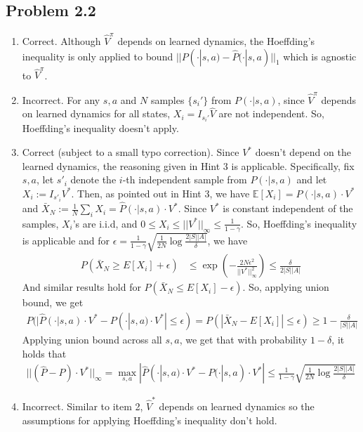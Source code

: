 \documentclass{article}
\begin{document}
\subsection*{Problem 2.2}
\begin{enumerate}
    \item Correct. Although $\widehat{V}^\pi$ depends on learned dynamics, the Hoeffding's inequality is only applied to bound $||P(\cdot | s, a) - \widehat{P}(\cdot | s, a)||_1$ which is agnostic to $\widehat{V}^\pi$.
    \item Incorrect. For any $s, a$ and $N$ samples $\{s_i'\}$ from $P(\cdot |s, a)$, since $\widehat{V}^\pi$ depends on learned dynamics for all states, $X_i = I_{s_i'}\widehat{V}$ are not independent. So, Hoeffding's inequality doesn't apply.
    \item Correct (subject to a small typo correction). Since $V^*$ doesn't depend on the learned dynamics, the reasoning given in Hint 3 is applicable. Specifically, fix $s, a$, let $s'_i$ denote the $i$-th independent sample from $P(\cdot |s, a)$ and let $X_i := I_{s'_i}V^*$. Then, as pointed out in Hint 3, we have $\mathbb{E}[X_i] = P(\cdot |s, a) \cdot V^*$ and $\bar{X}_N := \frac{1}{N}\sum_i X_i = \widehat{P}(\cdot |s, a) \cdot V^*$. Since $V^*$ is constant independent of the samples, $X_i$'s are i.i.d, and $0 \leq X_i \leq ||V^*||_\infty \leq \frac{1}{1 - \gamma}$.
    So, Hoeffding's inequality is applicable and for $\epsilon = \frac{1}{1-\gamma}\sqrt{\frac{1}{2N}\log\frac{2|S||A|}{\delta}}$, we have 
\begin{align*}
P(\bar{X}_N \geq E[X_i] + \epsilon) &\leq \exp(-\frac{2N\epsilon^2}{||V^*||^2_\infty}) \leq \frac{\delta}{2|S||A|}
\end{align*}
And similar results hold for $P(\bar{X}_N \leq E[X_i] - \epsilon)$. So, applying union bound, we get
\begin{align*}
P(|\widehat{P}(\cdot | s, a)\cdot V^* - P(\cdot | s, a) \cdot V^*| \leq \epsilon) = P(|\bar{X}_N - E[X_i]| \leq \epsilon) \geq 1 - \frac{\delta}{|S||A|}
\end{align*}   
Applying union bound across all $s, a$, we get that with probability $1 - \delta$, it holds that
\begin{align*}
||(\widehat{P} - P) \cdot V^*||_\infty = \max_{s, a}|\widehat{P}(\cdot | s, a)\cdot V^* - P(\cdot | s, a) \cdot V^*| \leq \frac{1}{1-\gamma}\sqrt{\frac{1}{2N}\log\frac{2|S||A|}{\delta}}
\end{align*}
    \item Incorrect. Similar to item 2, $\widehat{V}^*$ depends on learned dynamics so the assumptions for applying Hoeffding's inequality don't hold.
\end{enumerate}
\end{document}
